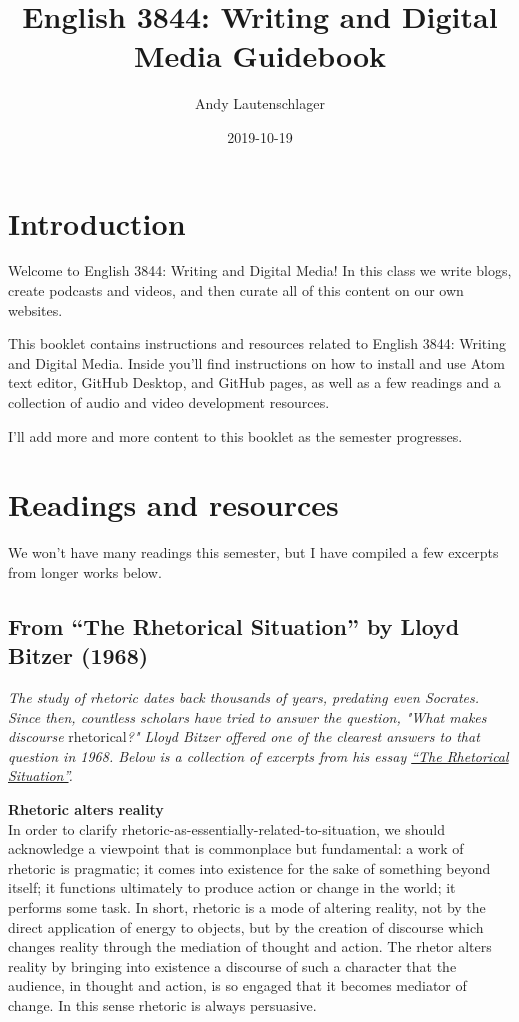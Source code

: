 \documentclass[]{book}
\title{English 3844: Writing and Digital Media Guidebook}
\author{Andy Lautenschlager}
\date{2019-10-19}
\theoremstyle{definition}
\theoremstyle{definition}
\theoremstyle{definition}
\theoremstyle{remark}
\begin{document}
\maketitle

{
\setcounter{tocdepth}{1}
\tableofcontents
}
\hypertarget{introduction}{%
\chapter{Introduction}\label{introduction}}

Welcome to English 3844: Writing and Digital Media! In this class we
write blogs, create podcasts and videos, and then curate all of this
content on our own websites.

This booklet contains instructions and resources related to English
3844: Writing and Digital Media. Inside you'll find instructions on how
to install and use Atom text editor, GitHub Desktop, and GitHub pages,
as well as a few readings and a collection of audio and video
development resources.

I'll add more and more content to this booklet as the semester
progresses.

\hypertarget{readings}{%
\chapter{Readings and resources}\label{readings}}

We won't have many readings this semester, but I have compiled a few
excerpts from longer works below.

\hypertarget{from-the-rhetorical-situation-by-lloyd-bitzer-1968}{%
\section{From ``The Rhetorical Situation'' by Lloyd Bitzer
(1968)}\label{from-the-rhetorical-situation-by-lloyd-bitzer-1968}}

\emph{The study of rhetoric dates back thousands of years, predating
even Socrates. Since then, countless scholars have tried to answer the
question, "What makes discourse} rhetorical\emph{?" Lloyd Bitzer offered
one of the clearest answers to that question in 1968. Below is a
collection of excerpts from his essay
\href{http://www.arts.uwaterloo.ca/~raha/309CWeb/Bitzer(1968).pdf}{``The
Rhetorical Situation''}.}

\textbf{Rhetoric alters reality}\\
In order to clarify rhetoric-as-essentially-related-to-situation, we
should acknowledge a viewpoint that is commonplace but fundamental: a
work of rhetoric is pragmatic; it comes into existence for the sake of
something beyond itself; it functions ultimately to produce action or
change in the world; it performs some task. In short, rhetoric is a mode
of altering reality, not by the direct application of energy to objects,
but by the creation of discourse which changes reality through the
mediation of thought and action. The rhetor alters reality by bringing
into existence a discourse of such a character that the audience, in
thought and action, is so engaged that it becomes mediator of change. In
this sense rhetoric is always persuasive.
\end{document}
